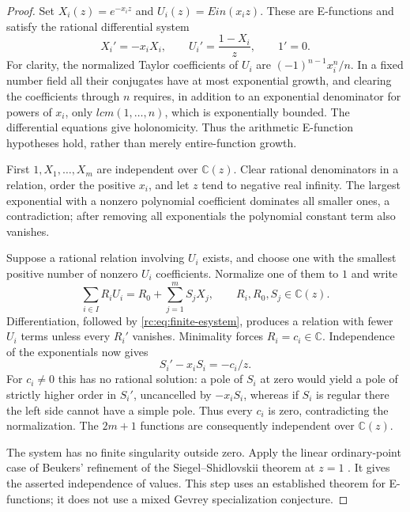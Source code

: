 \documentclass[11pt,a4paper]{article}
\theoremstyle{definition}
\theoremstyle{remark}
\theoremstyle{plain}
\numberwithin{equation}{section}
\def\operatorname#1{#1}\def\mathrm#1{#1}}
\providecommand{\rcEin}{\operatorname{Ein}}
\providecommand{\rcC}{\mathbb C}
\begin{document}
\begin{proof}
Set $X_i(z)=e^{-x_i z}$ and $U_i(z)=\rcEin(x_i z)$.  These are
E-functions and satisfy the rational differential system
\begin{equation}\label{rc:eq:finite-esystem}
 X_i'=-x_iX_i,\qquad U_i'=\frac{1-X_i}{z},\qquad 1'=0.
\end{equation}
For clarity, the normalized Taylor coefficients of $U_i$ are
$(-1)^{n-1}x_i^n/n$.  In a fixed number field all their conjugates have
at most exponential growth, and clearing the coefficients through $n$
requires, in addition to an exponential denominator for powers of $x_i$,
only $\operatorname{lcm}(1,\ldots,n)$, which is exponentially bounded.
The differential equations give holonomicity.  Thus the arithmetic
E-function hypotheses hold, rather than merely entire-function growth.

First $1,X_1,\ldots,X_m$ are independent over $\rcC(z)$.  Clear rational
denominators in a relation, order the positive $x_i$, and let $z$ tend to
negative real infinity.  The largest exponential with a nonzero polynomial
coefficient dominates all smaller ones, a contradiction; after removing
all exponentials the polynomial constant term also vanishes.

Suppose a rational relation involving $U_i$ exists, and choose one with
the smallest positive number of nonzero $U_i$ coefficients.  Normalize
one of them to $1$ and write
\[
 \sum_{i\in I}R_iU_i=R_0+\sum_{j=1}^m S_jX_j,
 \qquad R_i,R_0,S_j\in\rcC(z).
\]
Differentiation, followed by \eqref{rc:eq:finite-esystem}, produces a
relation with fewer $U_i$ terms unless every $R_i'$ vanishes.  Minimality
forces $R_i=c_i\in\rcC$.  Independence of the exponentials now gives
\[
 S_i'-x_iS_i=-c_i/z.
\]
For $c_i\ne0$ this has no rational solution: a pole of $S_i$ at zero
would yield a pole of strictly higher order in $S_i'$, uncancelled by
$-x_iS_i$, whereas if $S_i$ is regular there the left side cannot have a
simple pole.  Thus every $c_i$ is zero, contradicting the normalization.
The $2m+1$ functions are consequently independent over $\rcC(z)$.

The system has no finite singularity outside zero.  Apply the linear
ordinary-point case of Beukers' refinement of the Siegel--Shidlovskii
theorem at $z=1$ \cite[Theorem 1.3]{Beukers}.  It gives the asserted
independence of values.  This step uses an established theorem for
E-functions; it does not use a mixed Gevrey specialization conjecture.
\end{proof}
\end{document}
